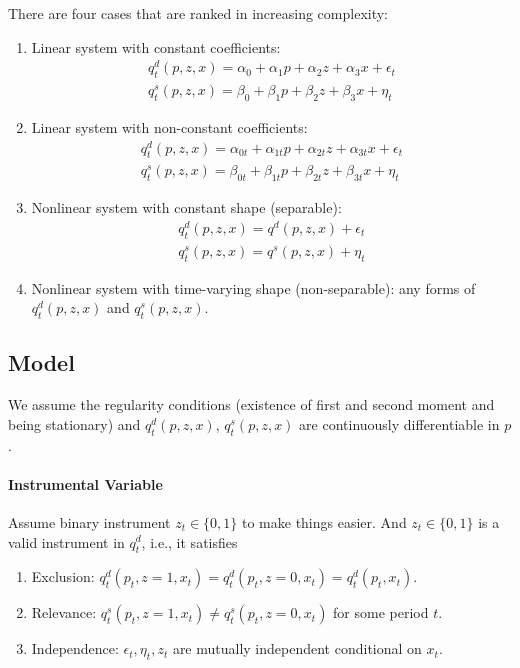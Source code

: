 \documentclass[11pt]{elegantbook}
\begin{document}
There are four cases that are ranked in increasing complexity:
\begin{enumerate}
    \item Linear system with constant coefficients:
    \begin{equation}
        \begin{aligned}
            q^d_t(p,z,x)=\alpha_0+\alpha_1 p+\alpha_2 z+\alpha_3 x+\epsilon_t\\
            q^s_t(p,z,x)=\beta_0+\beta_1 p+\beta_2 z+\beta_3 x+\eta_t
        \end{aligned}
        \nonumber
    \end{equation}
    \item Linear system with non-constant coefficients:
    \begin{equation}
        \begin{aligned}
            q^d_t(p,z,x)=\alpha_{0t}+\alpha_{1t} p+\alpha_{2t} z+\alpha_{3t} x +\epsilon_t\\
            q^s_t(p,z,x)=\beta_{0t}+\beta_{1t} p+\beta_{2t} z+\beta_{3t} x +\eta_t
        \end{aligned}
        \nonumber
    \end{equation}
    \item Nonlinear system with constant shape (separable):
    \begin{equation}
        \begin{aligned}
            q^d_t(p,z,x)=q^d(p,z,x)+\epsilon_t\\
            q^s_t(p,z,x)=q^s(p,z,x)+\eta_t
        \end{aligned}
        \nonumber
    \end{equation}
    \item Nonlinear system with time-varying shape (non-separable): any forms of $q^d_t(p,z,x)$ and $q^s_t(p,z,x)$.
\end{enumerate}

\subsection{Model}
We assume the regularity conditions (existence of first and second moment and being stationary) and $q^d_t(p,z,x)$, $q^s_t(p,z,x)$ are continuously differentiable in $p$.

\paragraph*{Instrumental Variable}
Assume binary instrument $z_t\in\{0,1\}$ to make things easier. And $z_t\in\{0,1\}$ is a valid instrument in $q^d_t$, i.e., it satisfies
\begin{enumerate}
    \item Exclusion: $q^d_t(p_t,z=1,x_t)=q^d_t(p_t,z=0,x_t)=q^d_t(p_t,x_t)$.
    \item Relevance: $q^s_t(p_t,z=1,x_t)\neq q^s_t(p_t,z=0,x_t)$ for some period $t$.
    \item Independence: $\epsilon_t,\eta_t,z_t$ are mutually independent conditional on $x_t$.
\end{enumerate}
\end{document}
